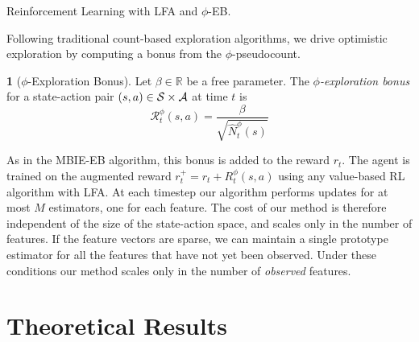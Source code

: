 \documentclass{article}
\theoremstyle{definition}
\newtheorem{defn}{\protect\definitionname}
\theoremstyle{definition}
\theoremstyle{plain}
\theoremstyle{plain}
\theoremstyle{plain}
\providecommand{\definitionname}{Definition}
\begin{document}
\begin{algorithm}
\begin{algorithmic}
\EndFor
{}
\EndWhile
\State{}
\end{algorithmic}

\caption{Reinforcement Learning with LFA and $\phi$-EB.\label{alg:Reinforcement-learning-with}}
\end{algorithm}
\label{alg:RLPHIEB}Following traditional count-based exploration
algorithms, we drive optimistic exploration by computing a bonus from
the $\phi$-pseudocount.
\begin{defn}
[$\phi$-Exploration Bonus] Let $\beta\in\mathbb{R}$ be a free parameter.
The \emph{$\phi$-exploration bonus }for a state-action pair $(s,a)\in\mbox{\ensuremath{\mathcal{S}}}\times\mathcal{A}$
at time $t$ is
\[
\mathcal{R}_{t}^{\phi}(s,a)=\frac{\beta}{\sqrt{\hat{N}_{t}^{\phi}(s)}}
\]

\end{defn}
As in the MBIE-EB algorithm, this bonus is added to the reward $r_{t}$.
The agent is trained on the augmented reward $r_{t}^{+}=r_{t}+R_{t}^{\phi}(s,a)$
using any value-based RL algorithm with LFA. At each timestep our
algorithm performs updates for at most $M$ estimators, one for each
feature. The cost of our method is therefore independent of the size
of the state-action space, and scales only in the number of features.
If the feature vectors are sparse, we can maintain a single prototype
estimator for all the features that have not yet been observed. Under
these conditions our method scales only in the number of \emph{observed
}features.


\section{Theoretical Results}
\end{document}
